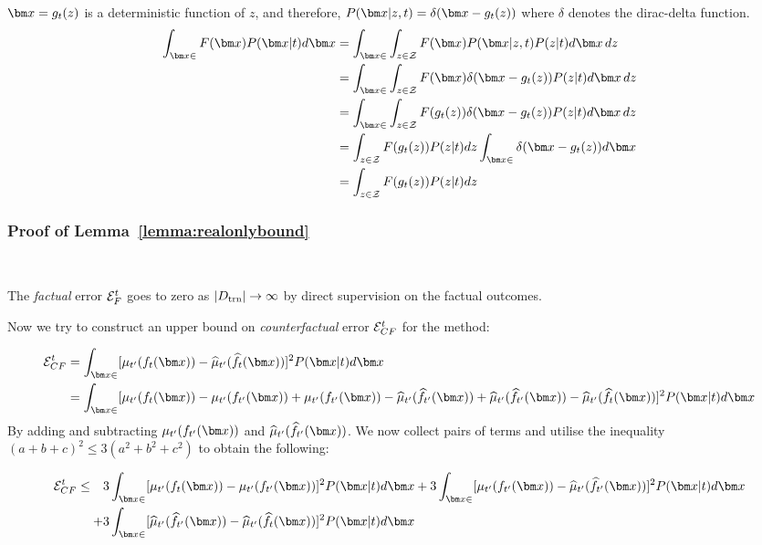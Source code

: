 $\xb = \R_t(z)$ is a deterministic function of $z$, and therefore, $P(\xb|z, t) = \delta(\xb - \R_t(z))$ where $\delta$ denotes the dirac-delta function.
\begin{align*}
        \int_{\xb \in \xspace}F(\xb)P(\xb|t)d\xb &= \int_{\xb \in \xspace}\int_{z \in \Zspace}F(\xb)P(\xb|z, t)P(z|t)d\xb\, dz\\
        &=\int_{\xb \in \xspace}\int_{z \in \Zspace}F(\xb)\delta(\xb - \R_t(z))P(z|t)d\xb\, dz\\
        &=\int_{\xb \in \xspace}\int_{z \in \Zspace}F(\R_t(z))\delta(\xb - \R_t(z))P(z|t)d\xb\, dz\\
        &= \int_{z \in \Zspace}F(\R_t(z))P(z|t)dz \int_{\xb \in \xspace}\delta(\xb - \R_t(z)) d\xb\\
        &=\int_{z \in \Zspace} F(\R_t(z))P(z|t)dz
\end{align*}

\subsubsection{Proof of Lemma~\ref{lemma:realonlybound}}
\label{app:lemma:realonlybound}
\lemmarealonlybound\

The \textit{factual} error $\mathcal{E}_F^t$ goes to zero as $|D_{\text{trn}}| \to \infty$ by direct supervision on the factual outcomes.

Now we try to construct an upper bound on \textit{counterfactual} error $\mathcal{E}_{CF}^t$ for the \textit{\realonly} method:

\begin{align*}
    \ErrCF^t &= \int_{\xb \in \xspace}[\realmu_{t'}(\RInv_t(\xb)) - \realmuhat_{t'}(\RInvhat_t(\xb))]^2 P(\xb|t)d\xb\\
    &= \int_{\xb \in \xspace}[\realmu_{t'}(\RInv_t(\xb)) -\realmu_{t'}(\RInv_{t'}(\xb)) + \realmu_{t'}(\RInv_{t'}(\xb)) - \realmuhat_{t'}(\RInvhat_{t'}(\xb)) + \realmuhat_{t'}(\RInvhat_{t'}(\xb))  - \realmuhat_{t'}(\RInvhat_t(\xb))]^2 P(\xb|t)d\xb
\end{align*}
By adding and subtracting $\realmu_{t'}(\RInv_{t'}(\xb))$ and $\realmuhat_{t'}(\RInvhat_{t'}(\xb))$. We now collect pairs of terms and utilise the inequality $(a+b+c)^2 \leq 3(a^2 + b^2 + c^2)$ to obtain the following:

\begin{align*}
    \ErrCF^t \leq \quad &3\int_{\xb \in \xspace}[\realmu_{t'}(\RInv_t(\xb)) -\realmu_{t'}(\RInv_{t'}(\xb))]^2 P(\xb|t)d\xb
    + 3\int_{\xb \in \xspace}[\realmu_{t'}(\RInv_{t'}(\xb)) - \realmuhat_{t'}(\RInvhat_{t'}(\xb))]^2 P(\xb|t)d\xb\\
    + &3\int_{\xb \in \xspace}[\realmuhat_{t'}(\RInvhat_{t'}(\xb))  - \realmuhat_{t'}(\RInvhat_t(\xb))]^2 P(\xb|t)d\xb
\end{align*}

